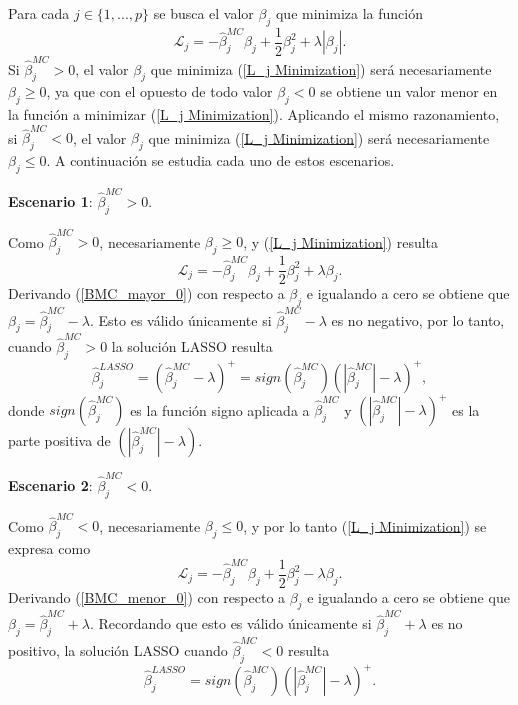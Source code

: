 \documentclass[a4paper,12pt]{report}
\begin{document}
Para cada $j \in \{1,...,p\}$ se busca el valor $\beta_j$ que minimiza la función
\begin{equation}
\label{L_j Minimization}
\mathcal{L}_j=-\hat{\beta}_j^{MC}\beta_j+\frac{1}{2}\beta_j^2+\lambda|\beta_j|.
\end{equation} 
Si $\hat{\beta}_j^{MC} > 0$, el valor $\beta_j$ que minimiza (\ref{L_j Minimization}) será necesariamente $\beta_j \geq 0$, ya que con el opuesto de todo valor $\beta_j < 0$ se obtiene un valor menor en la función a minimizar (\ref{L_j Minimization}). Aplicando el mismo razonamiento, si $\hat{\beta}_j^{MC} < 0$, el valor $\beta_j$ que minimiza (\ref{L_j Minimization}) será necesariamente $\beta_j \leq 0$. A continuación se estudia cada uno de estos escenarios. 

\textbf{Escenario 1}: $\hat{\beta}_j^{MC} > 0$. 

Como $\hat{\beta}_j^{MC} > 0$, necesariamente $\beta_j \geq 0$, y (\ref{L_j Minimization}) resulta 
\begin{equation}
\label{BMC_mayor_0}
\mathcal{L}_j=-\hat{\beta}_j^{MC}\beta_j+\frac{1}{2}\beta_j^2+\lambda \beta_j.
\end{equation}
Derivando (\ref{BMC_mayor_0}) con respecto a $\beta_j$ e igualando a cero se obtiene que $\beta_j=\hat{\beta}_j^{MC}-\lambda$. Esto es válido únicamente si $\hat{\beta}_j^{MC}-\lambda$ es no negativo, por lo tanto, cuando $\hat{\beta}_j^{MC} > 0$ la solución LASSO resulta
\begin{equation}
\label{Beta_LASSO_1}
\hat{\beta}_j^{LASSO}=(\hat{\beta}_j^{MC}-\lambda)^+=sign(\hat{\beta}_j^{MC})(|\hat{\beta}_j^{MC}|-\lambda)^+,
\end{equation}
donde $sign(\hat{\beta}_j^{MC})$ es la función signo aplicada a $\hat{\beta}_j^{MC}$ y $(|\hat{\beta}_j^{MC}|-\lambda)^+$ es la parte positiva de $(|\hat{\beta}_j^{MC}|-\lambda)$.

\textbf{Escenario 2}: $\hat{\beta}_j^{MC} < 0$.

Como $\hat{\beta}_j^{MC} < 0$, necesariamente $\beta_j \leq 0$, y por lo tanto (\ref{L_j Minimization}) se expresa como
\begin{equation}
\label{BMC_menor_0}
\mathcal{L}_j=-\hat{\beta}_j^{MC}\beta_j+\frac{1}{2}\beta_j^2-\lambda \beta_j.
\end{equation}
Derivando (\ref{BMC_menor_0}) con respecto a $\beta_j$ e igualando a cero se obtiene que $\beta_j=\hat{\beta}_j^{MC}+\lambda$. Recordando que esto es válido únicamente si $\hat{\beta}_j^{MC}+\lambda$ es no positivo, la solución LASSO cuando $\hat{\beta}_j^{MC} < 0$ resulta
\begin{equation}
\label{Beta_LASSO_2}
\hat{\beta}_j^{LASSO}=sign(\hat{\beta}_j^{MC})(|\hat{\beta}_j^{MC}|-\lambda)^+.
\end{equation}
\end{document}
